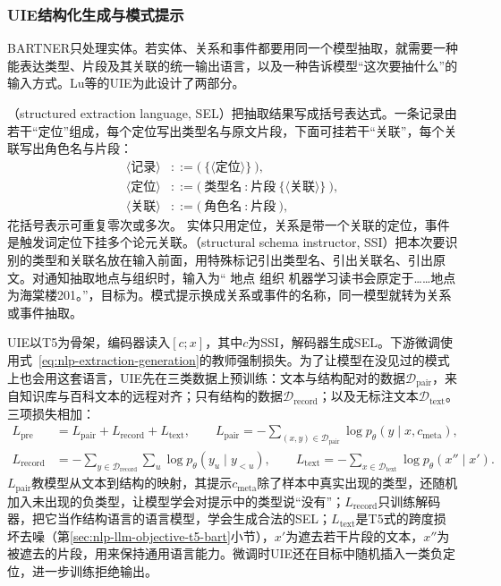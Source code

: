 \subsubsection{UIE结构化生成与模式提示}
\label{sec:nlp-extraction-uie}

BARTNER只处理实体。若实体、关系和事件都要用同一个模型抽取，就需要一种能表达类型、片段及其关联的统一输出语言，以及一种告诉模型“这次要抽什么”的输入方式。Lu等的UIE为此设计了两部分。

（structured extraction language, SEL）把抽取结果写成括号表达式。一条记录由若干“定位”组成，每个定位写出类型名与原文片段，下面可挂若干“关联”，每个关联写出角色名与片段：
\[
  \begin{aligned}
    \langle\text{记录}\rangle&::=\texttt{(}\ \{\langle\text{定位}\rangle\}\ \texttt{)},\\
    \langle\text{定位}\rangle&::=\texttt{(}\ \text{类型名}\ \texttt{:}\ \text{片段}\ \{\langle\text{关联}\rangle\}\ \texttt{)},\\
    \langle\text{关联}\rangle&::=\texttt{(}\ \text{角色名}\ \texttt{:}\ \text{片段}\ \texttt{)},
  \end{aligned}
\]
花括号表示可重复零次或多次。
实体只用定位，关系是带一个关联的定位，事件是触发词定位下挂多个论元关联。（structural schema instructor, SSI）把本次要识别的类型和关联名放在输入前面，用特殊标记\code{[spot]}引出类型名、\code{[asso]}引出关联名、\code{[text]}引出原文。对通知抽取地点与组织时，输入为“\code{[spot]} 地点 \code{[spot]} 组织 \code{[text]} 机器学习读书会原定于……地点为海棠楼201。”，目标为。模式提示换成关系或事件的名称，同一模型就转为关系或事件抽取。

UIE以T5为骨架，编码器读入$[c;x]$，其中$c$为SSI，解码器生成SEL。下游微调使用式~\eqref{eq:nlp-extraction-generation}的教师强制损失。为了让模型在没见过的模式上也会用这套语言，UIE先在三类数据上预训练：文本与结构配对的数据$\mathcal D_{\mathrm{pair}}$，来自知识库与百科文本的远程对齐；只有结构的数据$\mathcal D_{\mathrm{record}}$；以及无标注文本$\mathcal D_{\mathrm{text}}$。三项损失相加：
\begin{equation}
  \begin{aligned}
    L_{\mathrm{pre}}&=L_{\mathrm{pair}}+L_{\mathrm{record}}+L_{\mathrm{text}},\qquad
    L_{\mathrm{pair}}=-\sum_{(x,y)\in\mathcal D_{\mathrm{pair}}}\log p_\theta(y\mid x,c_{\mathrm{meta}}),\\
    L_{\mathrm{record}}&=-\sum_{y\in\mathcal D_{\mathrm{record}}}\sum_{u}\log p_\theta(y_u\mid y_{<u}),\qquad
    L_{\mathrm{text}}=-\sum_{x\in\mathcal D_{\mathrm{text}}}\log p_\theta(x''\mid x').
  \end{aligned}
  \label{eq:nlp-extraction-uie-pretrain}
\end{equation}
$L_{\mathrm{pair}}$教模型从文本到结构的映射，其提示$c_{\mathrm{meta}}$除了样本中真实出现的类型，还随机加入未出现的负类型，让模型学会对提示中的类型说“没有”；$L_{\mathrm{record}}$只训练解码器，把它当作结构语言的语言模型，学会生成合法的SEL；$L_{\mathrm{text}}$是T5式的跨度损坏去噪（第\ref{sec:nlp-llm-objective-t5-bart}小节），$x'$为遮去若干片段的文本，$x''$为被遮去的片段，用来保持通用语言能力。微调时UIE还在目标中随机插入一类负定位，进一步训练拒绝输出。

